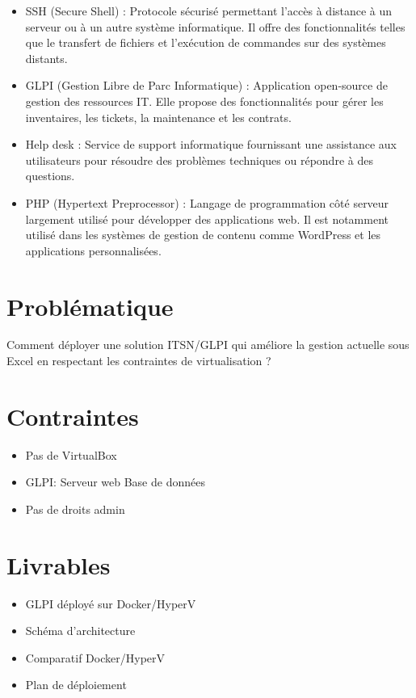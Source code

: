 \documentclass{article}
\begin{document}
\begin{itemize}
  \item SSH (Secure Shell) : Protocole sécurisé permettant l’accès à distance à un serveur ou à un autre système informatique. Il offre des fonctionnalités telles que le transfert de fichiers et l’exécution de commandes sur des systèmes distants.
  \item GLPI (Gestion Libre de Parc Informatique) : Application open-source de gestion des ressources IT. Elle propose des fonctionnalités pour gérer les inventaires, les tickets, la maintenance et les contrats.
  \item Help desk : Service de support informatique fournissant une assistance aux utilisateurs pour résoudre des problèmes techniques ou répondre à des questions.
  \item PHP (Hypertext Preprocessor) : Langage de programmation côté serveur largement utilisé pour développer des applications web. Il est notamment utilisé dans les systèmes de gestion de contenu comme WordPress et les applications personnalisées.
\end{itemize}


\section{Problématique}

Comment déployer une solution ITSN/GLPI qui améliore la gestion actuelle sous Excel en respectant les contraintes de virtualisation ?


\section{Contraintes}
\begin{itemize}
  \item Pas de VirtualBox
  \item GLPI:
  \subitem Serveur web
  \subitem Base de données
  \item Pas de droits admin
\end{itemize}

\section{Livrables}
\begin{itemize}
  \item GLPI déployé sur Docker/HyperV
  \item Schéma d'architecture
  \item Comparatif Docker/HyperV
  \item Plan de déploiement
\end{itemize}
\end{document}
